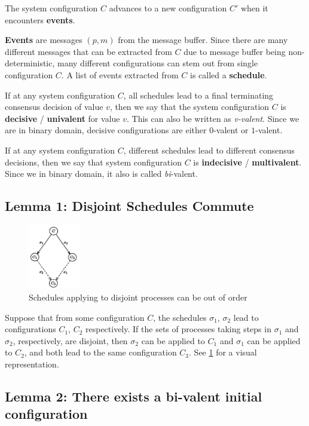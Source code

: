 The system configuration $C$ advances to a new configuration $C'$ when it encounters \textbf{events}. 

\textbf{Events} are messages $(p, m)$ from the message buffer. Since there are many different messages that can be extracted from $C$ due to message buffer being non-deterministic, many different configurations can stem out from single configuration $C$. A list of events extracted from $C$ is called a \textbf{schedule}.

If at any system configuration $C$, all schedules lead to a final terminating consensus decision of value $v$, then we say that the system configuration $C$ is \textbf{decisive} / \textbf{univalent} for value $v$. This can also be written as \emph{v-valent}. Since we are in binary domain, decisive configurations are either $0$-valent or $1$-valent.

If at any system configuration $C$, different schedules lead to different consensus decisions, then we say that system configuration $C$ is \textbf{indecisive} / \textbf{multivalent}. Since we in binary domain, it also is called \emph{bi}-valent.

\subsection{Lemma 1: Disjoint Schedules Commute}
\begin{figure}
    \centering
    \includegraphics[width=0.20\textwidth]{general-problems/assets/flp-impossibility-lemma1.png}
    \caption{Schedules applying to disjoint processes can be out of order}
    \label{fig:flp-impossibility-lemma1}
\end{figure}
Suppose that from some configuration $C$, the schedules $\sigma_1$, $\sigma_2$ lead to configurations $C_1$, $C_2$ respectively. If the sets of processes taking steps in $\sigma_1$ and $\sigma_2$, respectively, are disjoint, then $\sigma_2$ can be applied to $C_1$ and $\sigma_1$ can be applied to $C_2$, and both lead to the same configuration $C_3$. See \ref{fig:flp-impossibility-lemma1} for a visual representation.

\subsection{Lemma 2: There exists a bi-valent initial configuration}

